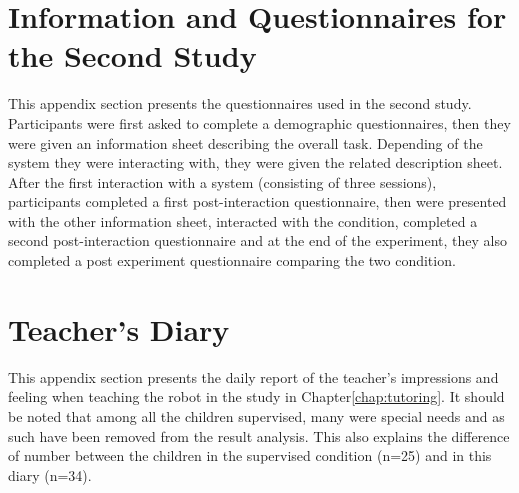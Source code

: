 \cleartooddpage
\chapter{Information and Questionnaires for the Second Study} \label{app:control_questionnaires}
This appendix section presents the questionnaires used in the second study. Participants were first asked to complete a demographic questionnaires, then they were given an information sheet describing the overall task. Depending of the system they were interacting with, they were given the related description sheet. After the first interaction with a system (consisting of three sessions), participants completed a first post-interaction questionnaire, then were presented with the other information sheet, interacted with the condition, completed a second post-interaction questionnaire and at the end of the experiment, they also completed a post experiment questionnaire comparing the two condition. 

\cleartooddpage
\chapter{Teacher's Diary} \label{app:diary}
This appendix section presents the daily report of the teacher's impressions and feeling when teaching the robot in the study in Chapter\ref{chap:tutoring}. It should be noted that among all the children supervised, many were special needs and as such have been removed from the result analysis. This also explains the difference of number between the children in the supervised condition (n=25) and in this diary (n=34).

